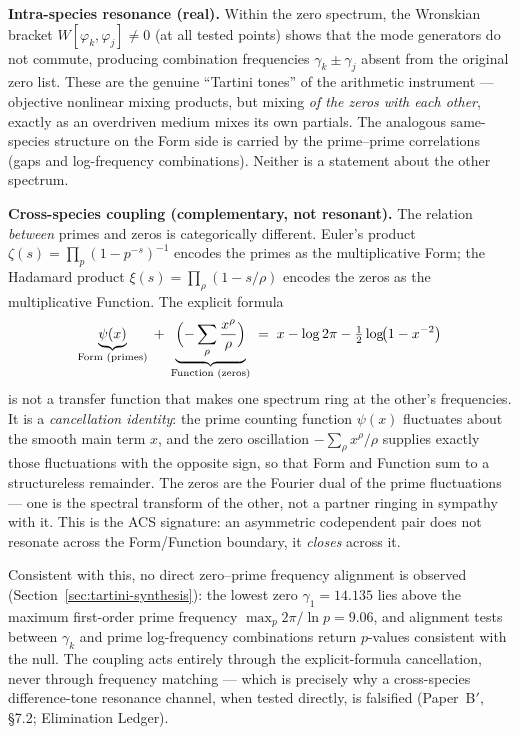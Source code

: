 \documentclass[11pt,a4paper]{article}
\theoremstyle{plain}
\theoremstyle{definition}
\theoremstyle{remark}
\begin{document}
\textbf{Intra-species resonance (real).}
Within the zero spectrum, the Wronskian bracket
$W[\varphi_k, \varphi_j] \neq 0$ (at all tested points) shows that the
mode generators do not commute, producing combination frequencies
$\gamma_k \pm \gamma_j$ absent from the original zero list.  These are
the genuine ``Tartini tones'' of the arithmetic instrument --- objective
nonlinear mixing products, but mixing \emph{of the zeros with each
other}, exactly as an overdriven medium mixes its own partials.  The
analogous same-species structure on the Form side is carried by the
prime--prime correlations (gaps and log-frequency combinations).
Neither is a statement about the other spectrum.

\textbf{Cross-species coupling (complementary, not resonant).}
The relation \emph{between} primes and zeros is categorically different.
Euler's product $\zeta(s) = \prod_p (1 - p^{-s})^{-1}$ encodes the primes
as the multiplicative Form; the Hadamard product
$\xi(s) = \prod_\rho (1 - s/\rho)$ encodes the zeros as the multiplicative
Function.  The explicit formula
\[
  \underbrace{\psi(x)}_{\text{Form (primes)}}
  \;+\;
  \underbrace{\Bigl(-\sum_\rho \frac{x^\rho}{\rho}\Bigr)}_{\text{Function (zeros)}}
  \;=\;
  x - \log 2\pi - \tfrac{1}{2}\log\!\bigl(1 - x^{-2}\bigr)
\]
is not a transfer function that makes one spectrum ring at the other's
frequencies.  It is a \emph{cancellation identity}: the prime counting
function $\psi(x)$ fluctuates about the smooth main term $x$, and the
zero oscillation $-\sum_\rho x^\rho/\rho$ supplies exactly those
fluctuations with the opposite sign, so that Form and Function sum to a
structureless remainder.  The zeros are the Fourier dual of the prime
fluctuations --- one is the spectral transform of the other, not a
partner ringing in sympathy with it.  This is the ACS signature: an
asymmetric codependent pair does not resonate across the Form/Function
boundary, it \emph{closes} across it.

Consistent with this, no direct zero--prime frequency alignment is
observed (Section~\ref{sec:tartini-synthesis}): the lowest zero
$\gamma_1 = 14.135$ lies above the maximum first-order prime frequency
$\max_p 2\pi/\ln p = 9.06$, and alignment tests between $\gamma_k$ and
prime log-frequency combinations return $p$-values consistent with the
null.  The coupling acts entirely through the explicit-formula
cancellation, never through frequency matching --- which is precisely
why a cross-species difference-tone resonance channel, when tested
directly, is falsified (Paper~B$'$, \S7.2; Elimination Ledger).
\end{document}
